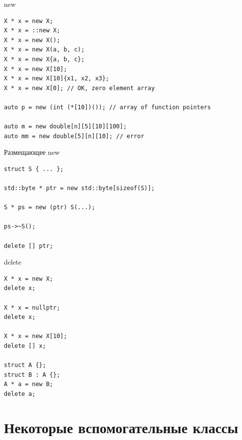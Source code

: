\documentclass[unknownkeysallowed,xcolor=table]{beamer}
\begin{document}
\begin{frame}[fragile]{new}

\begin{lstlisting}
X * x = new X;
X * x = ::new X;
X * x = new X();
X * x = new X(a, b, c);
X * x = new X{a, b, c};
X * x = new X[10];
X * x = new X[10]{x1, x2, x3};
X * x = new X[0]; // OK, zero element array

auto p = new (int (*[10])()); // array of function pointers

auto m = new double[n][5][10][100];
auto mm = new double[5][n][10]; // error
\end{lstlisting}

\end{frame}

\begin{frame}[fragile]{Размещающее new}

\begin{lstlisting}
struct S { ... };

std::byte * ptr = new std::byte[sizeof(S)];

S * ps = new (ptr) S(...);

ps->~S();

delete [] ptr;

\end{lstlisting}

\end{frame}

\begin{frame}[fragile]{delete}

\begin{lstlisting}
X * x = new X;
delete x;

X * x = nullptr;
delete x;

X * x = new X[10];
delete [] x;

struct A {};
struct B : A {};
A * a = new B;
delete a;
\end{lstlisting}

\end{frame}


\section{Некоторые вспомогательные классы}
\end{document}
